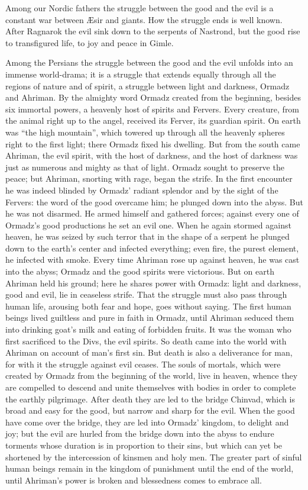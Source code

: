 \documentclass[12pt,a4paper,openany]{book}
\newcommand{\opage}[1]{\marginnote{\footnotesize\textit{[#1]}}}
\begin{document}
\setcounter{footnote}{0}%
\opage{40}Among our Nordic fathers the struggle between the good and the evil is a constant war
between Æsir and giants. How the struggle ends is well known. After Ragnarok the evil sink down
to the serpents of Nastrond, but the good rise to transfigured life, to joy and peace in
Gimle.

Among the Persians the struggle between the good and the evil unfolds into an immense
world-drama; it is a struggle that extends equally through all the regions of nature and of
spirit, a struggle between light and darkness, Ormadz and Ahriman. By the almighty word Ormadz
created from the beginning, besides six immortal powers, a heavenly host of spirits and
Fervers. Every creature, from the animal right up to the angel, received its Ferver, its
guardian spirit. On earth was ``the high mountain'', which towered up through all the heavenly
spheres right to the first light; there Ormadz fixed his dwelling. But from the south came
Ahriman, the evil spirit, with the host of darkness, and the host of darkness was just as
numerous and mighty as that of light. Ormadz sought to preserve the peace; but Ahriman,
snorting with rage, began the strife. In the first encounter he was indeed blinded by Ormadz'
radiant splendor and by the sight of the Fervers: the word of the good overcame him; he plunged
down into the abyss. But he was not disarmed. He armed himself and gathered forces; against
every one of Ormadz's good productions he set an evil one. When he again stormed against
heaven, he was seized by such terror that in the shape of a serpent he plunged down to the
earth's center and infected everything; even fire, the purest element, he infected with smoke.
Every time Ahriman rose up against heaven, he was cast into the abyss;
\setcounter{footnote}{0}%
\opage{41}Ormadz and the good spirits were victorious. But on earth Ahriman held his ground; here
he shares power with Ormadz: light and darkness, good and evil, lie in ceaseless strife. That
the struggle must also pass through human life, arousing both fear and hope, goes without
saying. The first human beings lived guiltless and pure in faith in Ormadz, until Ahriman
seduced them into drinking goat's milk and eating of forbidden fruits. It was the woman who
first sacrificed to the Divs, the evil spirits. So death came into the world with Ahriman on
account of man's first sin. But death is also a deliverance for man, for with it the struggle
against evil ceases. The souls of mortals, which were created by Ormadz from the beginning of
the world, live in heaven, whence they are compelled to descend and unite themselves with
bodies in order to complete the earthly pilgrimage. After death they are led to the bridge
Chinvad, which is broad and easy for the good, but narrow and sharp for the evil. When the good
have come over the bridge, they are led into Ormadz' kingdom, to delight and joy; but the evil
are hurled from the bridge down into the abyss to endure torments whose duration is in
proportion to their sins, but which can yet be shortened by the intercession of kinsmen and
holy men. The greater part of sinful human beings remain in the kingdom of punishment until the
end of the world, until Ahriman's power is broken and blessedness comes to embrace all.
\end{document}
